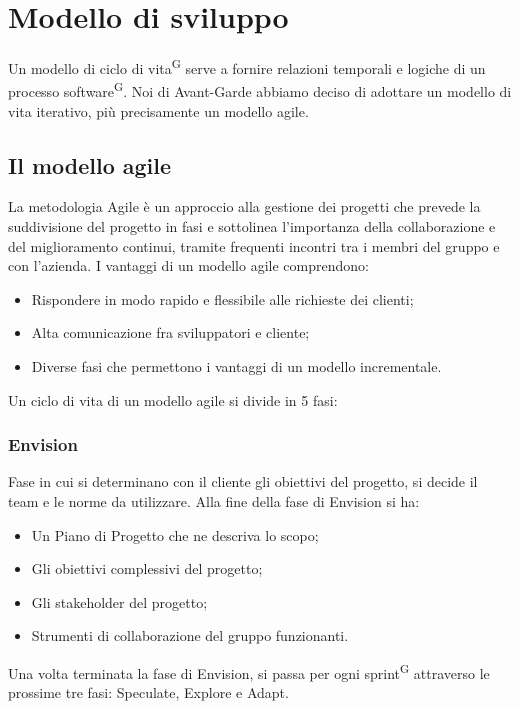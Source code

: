 \newpage
\section{Modello di sviluppo}\label{sec:modello_sviluppo}
Un modello di ciclo di vita\textsuperscript{G} serve a fornire relazioni temporali e logiche di un processo software\textsuperscript{G}.
Noi di Avant-Garde abbiamo deciso di adottare un modello di vita iterativo, più precisamente un modello agile.

\subsection{Il modello agile}\label{sec:modello_sviluppo:agile}
La metodologia Agile è un approccio alla gestione dei progetti che prevede la suddivisione del progetto in fasi e sottolinea l'importanza della collaborazione e del miglioramento continui, tramite frequenti incontri tra i membri del gruppo e con l'azienda.
I vantaggi di un modello agile comprendono:
\begin{itemize}
    \item Rispondere in modo rapido e flessibile alle richieste dei clienti;
    \item Alta comunicazione fra sviluppatori e cliente;
    \item Diverse fasi che permettono i vantaggi di un modello incrementale.
\end{itemize}
Un ciclo di vita di un modello agile si divide in 5 fasi:
    \subsubsection{Envision}\label{sec:modello_sviluppo:agile:envision}
    Fase in cui si determinano con il cliente gli obiettivi del progetto, si decide il team e le norme da utilizzare.
    Alla fine della fase di Envision si ha:
    \begin{itemize}
        \item Un Piano di Progetto che ne descriva lo scopo;
        \item Gli obiettivi complessivi del progetto;
        \item Gli stakeholder del progetto;
        \item Strumenti di collaborazione del gruppo funzionanti.
    \end{itemize}
    Una volta terminata la fase di Envision, si passa per ogni sprint\textsuperscript{G} attraverso le prossime tre fasi: Speculate, Explore e Adapt.
